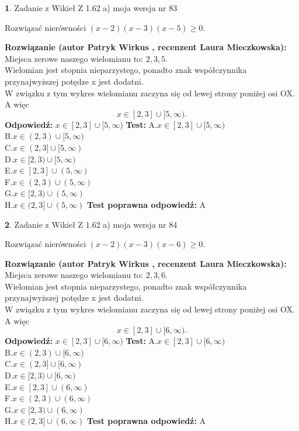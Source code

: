 \documentclass[12pt, a4paper]{article}
\theoremstyle{definition} %
\newtheorem{zad}{}
\newcommand{\zadStart}[1]{\begin{zad}#1\newline}
\newcommand{\zadStop}{\end{zad}}
\newcommand{\rozwStart}[2]{\noindent \textbf{Rozwiązanie (autor #1 , recenzent #2): }\newline}
\newcommand{\rozwStop}{\newline}
\newcommand{\odpStart}{\noindent \textbf{Odpowiedź:}\newline}
\newcommand{\odpStop}{\newline}
\newcommand{\testStart}{\noindent \textbf{Test:}\newline}
\newcommand{\testStop}{\newline}
\newcommand{\kluczStart}{\noindent \textbf{Test poprawna odpowiedź:}\newline}
\newcommand{\kluczStop}{\newline}
\begin{document}
\zadStart{Zadanie z Wikieł Z 1.62 a) moja wersja nr 83}

Rozwiązać nierówności $(x-2)(x-3)(x-5)\ge0$.
\zadStop
\rozwStart{Patryk Wirkus}{Laura Mieczkowska}
Miejsca zerowe naszego wielomianu to: $2, 3, 5$.\\
Wielomian jest stopnia nieparzystego, ponadto znak współczynnika przy\linebreak najwyższej potędze x jest dodatni.\\ W związku z tym wykres wielomianu zaczyna się od lewej strony poniżej osi OX. A więc $$x \in [2,3] \cup [5,\infty).$$
\rozwStop
\odpStart
$x \in [2,3] \cup [5,\infty)$
\odpStop
\testStart
A.$x \in [2,3] \cup [5,\infty)$\\
B.$x \in (2,3) \cup [5,\infty)$\\
C.$x \in (2,3] \cup [5,\infty)$\\
D.$x \in [2,3) \cup [5,\infty)$\\
E.$x \in [2,3] \cup (5,\infty)$\\
F.$x \in (2,3) \cup (5,\infty)$\\
G.$x \in [2,3) \cup (5,\infty)$\\
H.$x \in (2,3] \cup (5,\infty)$
\testStop
\kluczStart
A
\kluczStop



\zadStart{Zadanie z Wikieł Z 1.62 a) moja wersja nr 84}

Rozwiązać nierówności $(x-2)(x-3)(x-6)\ge0$.
\zadStop
\rozwStart{Patryk Wirkus}{Laura Mieczkowska}
Miejsca zerowe naszego wielomianu to: $2, 3, 6$.\\
Wielomian jest stopnia nieparzystego, ponadto znak współczynnika przy\linebreak najwyższej potędze x jest dodatni.\\ W związku z tym wykres wielomianu zaczyna się od lewej strony poniżej osi OX. A więc $$x \in [2,3] \cup [6,\infty).$$
\rozwStop
\odpStart
$x \in [2,3] \cup [6,\infty)$
\odpStop
\testStart
A.$x \in [2,3] \cup [6,\infty)$\\
B.$x \in (2,3) \cup [6,\infty)$\\
C.$x \in (2,3] \cup [6,\infty)$\\
D.$x \in [2,3) \cup [6,\infty)$\\
E.$x \in [2,3] \cup (6,\infty)$\\
F.$x \in (2,3) \cup (6,\infty)$\\
G.$x \in [2,3) \cup (6,\infty)$\\
H.$x \in (2,3] \cup (6,\infty)$
\testStop
\kluczStart
A
\kluczStop
\end{document}
